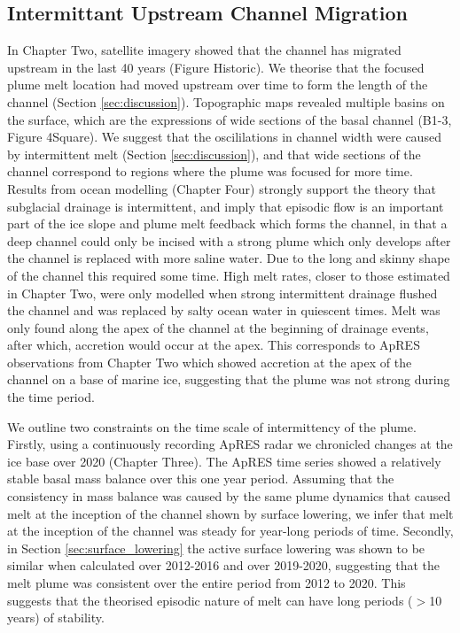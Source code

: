 \subsection{Intermittant Upstream Channel Migration}

In Chapter Two, satellite imagery showed that the channel has migrated upstream in the last 40 years (Figure Historic).  We theorise that the focused plume melt location had moved upstream over time to form the length of the channel (Section \ref{sec:discussion}). Topographic maps revealed multiple basins on the surface, which are the expressions of wide sections of the basal channel (B1-3, Figure 4Square). We suggest that the oscililations in channel width were  caused by intermittent melt (Section \ref{sec:discussion}), and that wide sections of the channel correspond to regions where the plume was focused for more time.
Results from ocean modelling (Chapter Four) strongly support the theory that subglacial drainage is intermittent, and imply that episodic flow is an important part of the ice slope and plume melt feedback which forms the channel, in that a deep channel could only be incised with a strong plume which only develops after the channel is replaced with more saline water. Due to the long and skinny shape of the channel this required some time.  High melt rates, closer to those estimated in Chapter Two, were only modelled when strong intermittent drainage flushed the channel and was replaced by salty ocean water in quiescent times. 
Melt was only found along the apex of the channel at the beginning of drainage events, after which, accretion would occur at the apex. This corresponds to ApRES observations from Chapter Two which showed accretion at the apex of the channel on a base of marine ice, suggesting that the plume was not strong during the time period. 

We outline two constraints on the time scale of intermittency of the plume. Firstly, using a continuously recording ApRES radar we chronicled changes at the ice base over 2020 (Chapter Three). The ApRES time series showed a relatively stable basal mass balance over this one year period. Assuming that the consistency in mass balance was caused by the same plume dynamics that caused melt at the inception of the channel shown by surface lowering, we infer that melt at the inception of the channel was steady for year-long periods of time. Secondly, in Section \ref{sec:surface_lowering} the active surface lowering was shown to be similar when calculated over 2012-2016 and over 2019-2020, suggesting that the melt plume was consistent over the entire period from 2012 to 2020. This suggests that the theorised episodic nature of melt can have long periods ($>$10 years) of stability.

